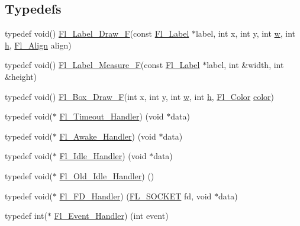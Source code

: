 \subsection*{Typedefs}
\begin{DoxyCompactItemize}
\item 
typedef void() \hyperlink{group__callback__functions_ga569530b250a4e2f56022249512687a0c}{Fl\+\_\+\+Label\+\_\+\+Draw\+\_\+F}(const \hyperlink{struct_fl___label}{Fl\+\_\+\+Label} $\ast$label, int x, int y, int \hyperlink{forms_8_h_aac374e320caaadeca4874add33b62af2}{w}, int \hyperlink{forms_8_h_a7e427ba5b307f9068129699250690066}{h}, \hyperlink{_enumerations_8_h_a44e8bcd1e030e65e4f88cbae64a7c3e3}{Fl\+\_\+\+Align} align)
\item 
typedef void() \hyperlink{group__callback__functions_ga946140c0dcd42dbef9f134af6f2da17b}{Fl\+\_\+\+Label\+\_\+\+Measure\+\_\+F}(const \hyperlink{struct_fl___label}{Fl\+\_\+\+Label} $\ast$label, int \&width, int \&height)
\item 
typedef void() \hyperlink{group__callback__functions_gacb24a62f521a0e02cd7872a3bfbf3855}{Fl\+\_\+\+Box\+\_\+\+Draw\+\_\+F}(int x, int y, int \hyperlink{forms_8_h_aac374e320caaadeca4874add33b62af2}{w}, int \hyperlink{forms_8_h_a7e427ba5b307f9068129699250690066}{h}, \hyperlink{_enumerations_8_h_a8b762953646f8abee866061f1af78a6a}{Fl\+\_\+\+Color} \hyperlink{gl2opengl_8h_a321f1e32cd01131a4f0e10f60a8fcc13}{color})
\item 
typedef void($\ast$ \hyperlink{group__callback__functions_ga17b5c6570394124287997166a50ff07a}{Fl\+\_\+\+Timeout\+\_\+\+Handler}) (void $\ast$data)
\item 
typedef void($\ast$ \hyperlink{group__callback__functions_ga28b44ff2052ca0b06d0da852fadd42c0}{Fl\+\_\+\+Awake\+\_\+\+Handler}) (void $\ast$data)
\item 
typedef void($\ast$ \hyperlink{group__callback__functions_gac9d2aab1d3142308450e2da09716013e}{Fl\+\_\+\+Idle\+\_\+\+Handler}) (void $\ast$data)
\item 
typedef void($\ast$ \hyperlink{group__callback__functions_ga238786923bf2e91732a7305fc0647dbf}{Fl\+\_\+\+Old\+\_\+\+Idle\+\_\+\+Handler}) ()
\item 
typedef void($\ast$ \hyperlink{group__callback__functions_ga2cff1a51089da7653ab49bae499dfbf4}{Fl\+\_\+\+F\+D\+\_\+\+Handler}) (\hyperlink{_fl_8_h_a02134b1207d9eb2dce7f6f70e76c199a}{F\+L\+\_\+\+S\+O\+C\+K\+ET} fd, void $\ast$data)
\item 
typedef int($\ast$ \hyperlink{group__callback__functions_ga188f6b1dd8e78ccc91c013fe5c6bba74}{Fl\+\_\+\+Event\+\_\+\+Handler}) (int event)

\end{DoxyCompactItemize}
